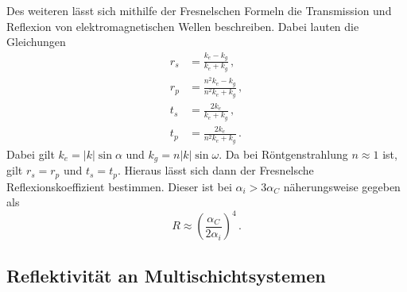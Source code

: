 Des weiteren lässt sich mithilfe der Fresnelschen Formeln die Transmission und Reflexion von elektromagnetischen Wellen beschreiben.
Dabei lauten die Gleichungen
\begin{align*}
    r_s & =\frac{k_{e} - k_{g}}{k_{e} + k_{g}} \, ,\\
    r_p & =\frac{n^2 k_{e} - k_{g}}{n^2 k_{e} + k_{g}} \, ,\\
    t_s & =\frac{2 k_{e}}{k_{e} + k_{g}} \, ,\\
    t_p & =\frac{2 k_{e}}{n^2 k_{e} + k_{g}} \, .
\end{align*}
Dabei gilt $k_{e} = |k| \sin \alpha$ und $k_{g} = n |k| \sin \omega$.
Da bei Röntgenstrahlung $n \approx 1$ ist, gilt $r_s = r_p$ und $t_s = t_p$.
Hieraus lässt sich dann der Fresnelsche Reflexionskoeffizient bestimmen.
Dieser ist bei $\alpha_i > 3 \alpha_C$ näherungsweise gegeben als \cite{tolan_xray}
\begin{equation}
    R\approx \left( \frac{\alpha_C}{2 \alpha_i} \right)^4 \, .
\end{equation}

\subsection{Reflektivität an Multischichtsystemen}

